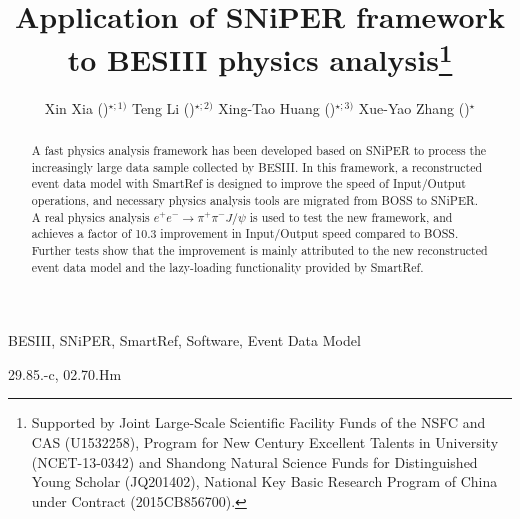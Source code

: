 \documentclass[a4paper,10pt,twoside]{cpc-hepnp}
\begin{document}
\begin{CJK*}{GB}{gbsn}




\title{Application of SNiPER framework to BESIII physics analysis\thanks{Supported by Joint Large-Scale Scientific Facility Funds of the NSFC and CAS (U1532258), Program for New Century Excellent Talents in University (NCET-13-0342) and Shandong Natural Science Funds for Distinguished Young Scholar (JQ201402), National Key Basic Research Program of China under Contract (2015CB856700).}}

\author{%
      Xin Xia ()$^{\star;1)}$%
\quad  Teng Li ()$^{\star;2)}$%
\quad  Xing-Tao Huang ()$^{\star;3)}$%
\quad  Xue-Yao Zhang ()$^{\star}$%
}
\maketitle


\address{%
$^\star$ Shandong University (SDU), Jinan, Shandong 250100, China\\
}


\begin{abstract}
A fast physics analysis framework has been developed based on SNiPER to process the increasingly large data sample collected by BESIII.
In this framework, a reconstructed event data model with SmartRef is designed to improve the speed of Input/Output operations, and necessary physics analysis tools are migrated from BOSS to SNiPER.
A real physics analysis $e^{+}e^{-} \rightarrow \pi^{+}\pi^{-}J/\psi$ is used to test the new framework, and achieves a factor of 10.3 improvement in Input/Output speed compared to BOSS.
Further tests show that the improvement is mainly attributed to the new reconstructed event data model and the lazy-loading functionality provided by SmartRef.
\end{abstract}


\begin{keyword}
BESIII, SNiPER, SmartRef, Software, Event Data Model
\end{keyword}


\begin{pacs}
29.85.-c, 02.70.Hm
\end{pacs}



\end{CJK*}
\end{document}
